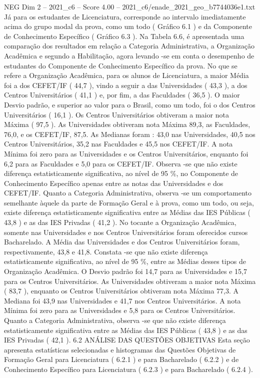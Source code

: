 \begin{textsample}{NEG Dim 2 – 2021\_c6 – Score 4.00 – 2021\_c6/enade\_2021\_geo\_b7744036e1.txt}
Já para os estudantes de Licenciatura, corresponde ao intervalo imediatamente acima do grupo modal da prova, como um todo ( Gráfico 6.1 ) e da Componente de Conhecimento Específico ( Gráfico 6.3 ).
Na Tabela 6.6, é apresentada uma comparação dos resultados em relação a Categoria Administrativa, a Organização Acadêmica e segundo a Habilitação, agora levando -se em conta o desempenho de estudantes do Componente de Conhecimento Específico da prova.
No que se refere a Organização Acadêmica, para os alunos de Licenciatura, a maior Média foi a dos CEFET/IF ( 44,7 ), vindo a seguir a das Universidades ( 43,3 ), a dos Centros Universitários ( 41,1 ) e, por fim, a das Faculdades ( 36,5 ).
O maior Desvio padrão, e superior ao valor para o Brasil, como um todo, foi o dos Centros Universitários ( 16,1 ).
Os Centros Universitários obtiveram a maior nota Máxima ( 97,5 ).
As Universidades obtiveram nota Máxima 89,3, as Faculdades, 76,0, e os CEFET/IF, 87,5.
As Medianas foram : 43,0 nas Universidades, 40,5 nos Centros Universitários, 35,2 nas Faculdades e 45,5 nos CEFET/IF.
A nota Mínima foi zero para as Universidades e os Centros Universitários, enquanto foi 6,2 para as Faculdades e 5,0 para os CEFET/IF.
Observa -se que não existe diferença estatisticamente significativa, ao nível de 95 \%, no Componente de Conhecimento Específico apenas entre as notas das Universidades e dos CEFET/IF.
Quanto a Categoria Administrativa, observa -se um comportamento semelhante àquele da parte de Formação Geral e à prova, como um todo, ou seja, existe diferença estatisticamente significativa entre as Médias das IES Públicas ( 43,8 ) e as das IES Privadas ( 41,2 ).
No tocante a Organização Acadêmica, somente nas Universidades e nos Centros Universitários foram oferecidos cursos Bacharelado.
A Média das Universidades e dos Centros Universitários foram, respectivamente, 43,8 e 41,8.
Constata -se que não existe diferença estatisticamente significativa, ao nível de 95 \%, entre as Médias desses tipos de Organização Acadêmica.
O Desvio padrão foi 14,7 para as Universidades e 15,7 para os Centros Universitários.
As Universidades obtiveram a maior nota Máxima ( 83,7 ), enquanto os Centros Universitários obtiveram nota Máxima 77,3.
A Mediana foi 43,9 nas Universidades e 41,7 nos Centros Universitários.
A nota Mínima foi zero para as Universidades e 5,8 para os Centros Universitários.
Quanto a Categoria Administrativa, observa -se que não existe diferença estatisticamente significativa entre as Médias das IES Públicas ( 43,8 ) e as das IES Privadas ( 42,1 ). 6.2 ANÁLISE DAS QUESTÕES OBJETIVAS Esta seção apresenta estatísticas selecionadas e histogramas das Questões Objetivas de Formação Geral para Licenciatura ( 6.2.1 ) e para Bacharelado ( 6.2.2 ) e de Conhecimento Específico para Licenciatura ( 6.2.3 ) e para Bacharelado ( 6.2.4 ).

\end{textsample}
